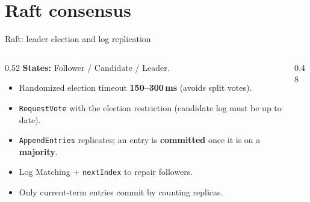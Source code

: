 \documentclass[aspectratio=169,11pt]{beamer}
\begin{document}
\section{Raft consensus}

\begin{frame}{Raft: leader election and log replication}
\begin{columns}
\begin{column}{0.52\textwidth}
\textbf{States:} Follower / Candidate / Leader.
\begin{itemize}\scriptsize
  \item Randomized election timeout \textbf{150--300\,ms} (avoids split votes).
  \item \texttt{RequestVote} with the election restriction (candidate log must be
  up to date).
  \item \texttt{AppendEntries} replicates; an entry is \textbf{committed} once it is
  on a \textbf{majority}.
  \item Log Matching + \texttt{nextIndex} to repair followers.
  \item Only current-term entries commit by counting replicas.
\end{itemize}
\end{column}
\begin{column}{0.48\textwidth}
\begin{center}
\end{center}
\end{column}
\end{columns}
\end{frame}
\end{document}

